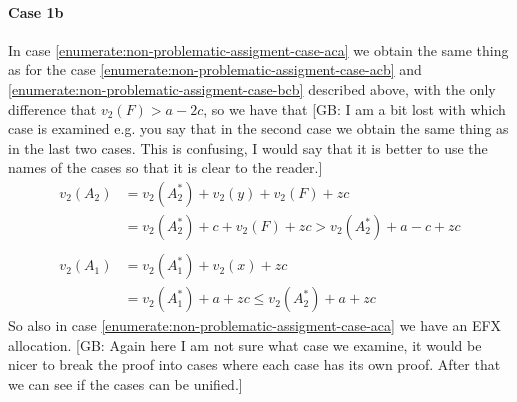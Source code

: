 \documentclass{article}
\newcommand{\gb}[1]{{\color{red}[GB: #1]}}
\begin{document}
\paragraph{Case 1b}
In case  \ref{enumerate:non-problematic-assigment-case-aca} we obtain the same thing as for the case  \ref{enumerate:non-problematic-assigment-case-acb} and \ref{enumerate:non-problematic-assigment-case-bcb} described above, with the only difference that $v_2(F) > a-2c$, so we have that 
\gb{I am a bit lost with which case is examined e.g. you say that in the second case we obtain the same thing as in the last two cases. This is confusing, I would say that it is better to use the names of the cases so that it is clear to the reader.}
\begin{align*}
    v_2(A_2) &= v_2(A_2^*) + v_2(y) + v_2(F) + zc\\
    &= v_2(A_2^*) + c + v_2(F) + zc > v_2(A_2^*) + a-c + zc\\\\
    v_2(A_1) &= v_2(A_1^*) + v_2(x) + zc\\
    &=v_2(A_1^*) + a + zc\le v_2(A_2^*) + a + zc
\end{align*}
So also in case \ref{enumerate:non-problematic-assigment-case-aca} we have an EFX allocation.
\gb{Again here I am not sure what case we examine, it would be nicer to break the proof into cases where each case has its own proof. After that we can see if the cases can be unified.} 
\end{document}
